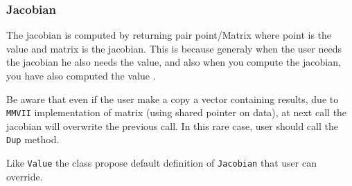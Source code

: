 \subsubsection{Jacobian}

The jacobian is computed by returning pair point/Matrix  where point is
the value  and matrix is the  jacobian. This is because generaly when the 
user needs the jacobian he also needs the value, and also when you 
compute the jacobian, you have also computed the value .

Be aware that even if the user make a copy a vector containing results,
due to {\tt MMVII} implementation of matrix (using shared pointer on data),
at next call the jacobian will overwrite the previous call.  In this rare
case, user should call the {\tt Dup} method.

Like {\tt Value} the  class propose default definition of {\tt Jacobian} that user can override.








